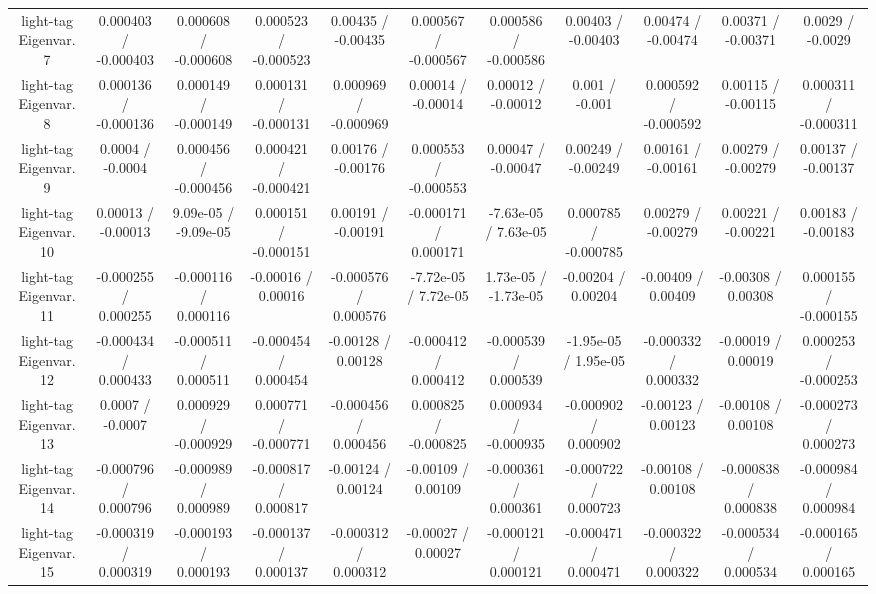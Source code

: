 \begin{table}[htbp]
\begin{center}
\begin{tabular}{|c|c|c|c|c|c|c|c|c|c|c|}
  light-tag Eigenvar. 7 & 0.000403 / -0.000403 & 0.000608 / -0.000608 & 0.000523 / -0.000523 & 0.00435 / -0.00435 & 0.000567 / -0.000567 & 0.000586 / -0.000586 & 0.00403 / -0.00403 & 0.00474 / -0.00474 & 0.00371 / -0.00371 & 0.0029 / -0.0029 \\ 
  light-tag Eigenvar. 8 & 0.000136 / -0.000136 & 0.000149 / -0.000149 & 0.000131 / -0.000131 & 0.000969 / -0.000969 & 0.00014 / -0.00014 & 0.00012 / -0.00012 & 0.001 / -0.001 & 0.000592 / -0.000592 & 0.00115 / -0.00115 & 0.000311 / -0.000311 \\ 
  light-tag Eigenvar. 9 & 0.0004 / -0.0004 & 0.000456 / -0.000456 & 0.000421 / -0.000421 & 0.00176 / -0.00176 & 0.000553 / -0.000553 & 0.00047 / -0.00047 & 0.00249 / -0.00249 & 0.00161 / -0.00161 & 0.00279 / -0.00279 & 0.00137 / -0.00137 \\ 
  light-tag Eigenvar. 10 & 0.00013 / -0.00013 & 9.09e-05 / -9.09e-05 & 0.000151 / -0.000151 & 0.00191 / -0.00191 & -0.000171 / 0.000171 & -7.63e-05 / 7.63e-05 & 0.000785 / -0.000785 & 0.00279 / -0.00279 & 0.00221 / -0.00221 & 0.00183 / -0.00183 \\ 
  light-tag Eigenvar. 11 & -0.000255 / 0.000255 & -0.000116 / 0.000116 & -0.00016 / 0.00016 & -0.000576 / 0.000576 & -7.72e-05 / 7.72e-05 & 1.73e-05 / -1.73e-05 & -0.00204 / 0.00204 & -0.00409 / 0.00409 & -0.00308 / 0.00308 & 0.000155 / -0.000155 \\ 
  light-tag Eigenvar. 12 & -0.000434 / 0.000433 & -0.000511 / 0.000511 & -0.000454 / 0.000454 & -0.00128 / 0.00128 & -0.000412 / 0.000412 & -0.000539 / 0.000539 & -1.95e-05 / 1.95e-05 & -0.000332 / 0.000332 & -0.00019 / 0.00019 & 0.000253 / -0.000253 \\ 
  light-tag Eigenvar. 13 & 0.0007 / -0.0007 & 0.000929 / -0.000929 & 0.000771 / -0.000771 & -0.000456 / 0.000456 & 0.000825 / -0.000825 & 0.000934 / -0.000935 & -0.000902 / 0.000902 & -0.00123 / 0.00123 & -0.00108 / 0.00108 & -0.000273 / 0.000273 \\ 
  light-tag Eigenvar. 14 & -0.000796 / 0.000796 & -0.000989 / 0.000989 & -0.000817 / 0.000817 & -0.00124 / 0.00124 & -0.00109 / 0.00109 & -0.000361 / 0.000361 & -0.000722 / 0.000723 & -0.00108 / 0.00108 & -0.000838 / 0.000838 & -0.000984 / 0.000984 \\ 
  light-tag Eigenvar. 15 & -0.000319 / 0.000319 & -0.000193 / 0.000193 & -0.000137 / 0.000137 & -0.000312 / 0.000312 & -0.00027 / 0.00027 & -0.000121 / 0.000121 & -0.000471 / 0.000471 & -0.000322 / 0.000322 & -0.000534 / 0.000534 & -0.000165 / 0.000165 \\ 

\end{tabular}
\end{center}
\end{table}
